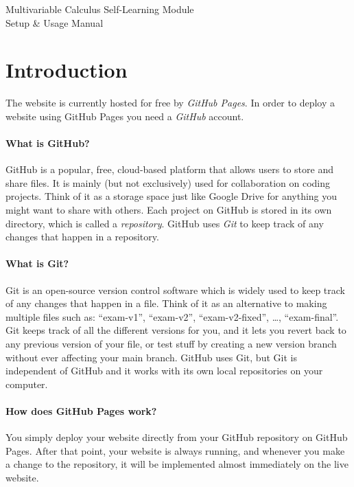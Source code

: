 \documentclass[a4paper,10pt]{article}
\begin{document}
\begingroup
\centering
\LARGE Multivariable Calculus Self-Learning Module\\[1em]
\large Setup \& Usage Manual\\[\baselineskip]
\endgroup

\tableofcontents
\listoffigures

\clearpage

\section{Introduction}

The website is currently hosted for free by \emph{GitHub Pages}. In order to deploy a website using GitHub Pages you need a \emph{GitHub} account. 

\paragraph{What is GitHub?} GitHub is a popular, free, cloud-based platform that allows users to store and share files. It is mainly (but not exclusively) used for collaboration on coding projects. Think of it as a storage space just like Google Drive for anything you might want to share with others. Each project on GitHub is stored in its own directory, which is called a \emph{repository}. GitHub uses \emph{Git} to keep track of any changes that happen in a repository.

\paragraph{What is Git?} Git is an open-source version control software which is widely used to keep track of any changes that happen in a file. Think of it as an alternative to making multiple files such as: ``exam-v1'', ``exam-v2'', ``exam-v2-fixed'', \dots, ``exam-final''. Git keeps track of all the different versions for you, and it lets you revert back to any previous version of your file, or test stuff by creating a new version branch without ever affecting your main branch. GitHub uses Git, but Git is independent of GitHub and it works with its own local repositories on your computer.

\paragraph{How does GitHub Pages work?} You simply deploy your website directly from your GitHub repository on GitHub Pages. After that point, your website is always running, and whenever you make a change to the repository, it will be implemented almost immediately on the live website.
\end{document}

